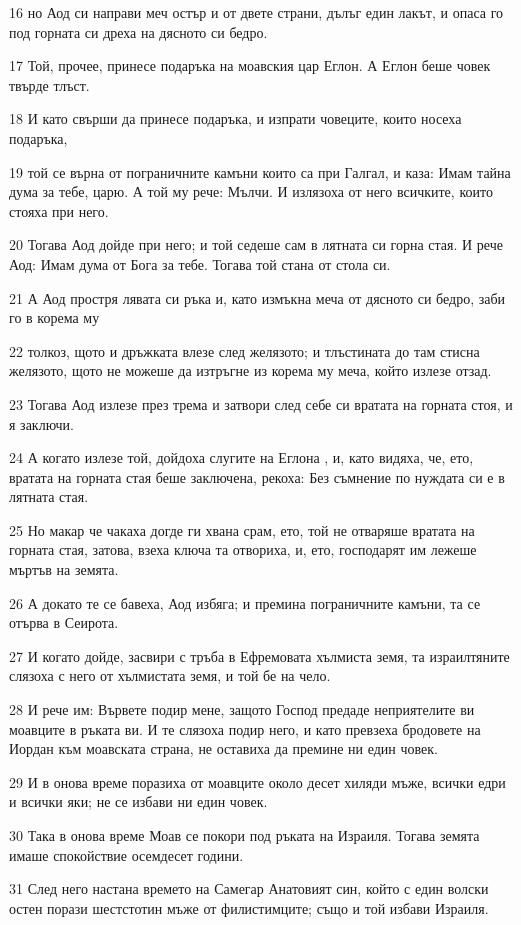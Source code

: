 \par 16 но Аод си направи меч остър и от двете страни, дълъг един лакът, и опаса го под горната си дреха на дясното си бедро.
\par 17 Той, прочее, принесе подаръка на моавския цар Еглон. А Еглон беше човек твърде тлъст.
\par 18 И като свърши да принесе подаръка, и изпрати човеците, които носеха подаръка,
\par 19 той се върна от пограничните камъни които са при Галгал, и каза: Имам тайна дума за тебе, царю. А той му рече: Мълчи. И излязоха от него всичките, които стояха при него.
\par 20 Тогава Аод дойде при него; и той седеше сам в лятната си горна стая. И рече Аод: Имам дума от Бога за тебе. Тогава той стана от стола си.
\par 21 А Аод простря лявата си ръка и, като измъкна меча от дясното си бедро, заби го в корема му
\par 22 толкоз, щото и дръжката влезе след желязото; и тлъстината до там стисна желязото, щото не можеше да изтръгне из корема му меча, който излезе отзад.
\par 23 Тогава Аод излезе през трема и затвори след себе си вратата на горната стоя, и я заключи.
\par 24 А когато излезе той, дойдоха слугите на Еглона , и, като видяха, че, ето, вратата на горната стая беше заключена, рекоха: Без съмнение по нуждата си е в лятната стая.
\par 25 Но макар че чакаха догде ги хвана срам, ето, той не отваряше вратата на горната стая, затова, взеха ключа та отвориха, и, ето, господарят им лежеше мъртъв на земята.
\par 26 А докато те се бавеха, Аод избяга; и премина пограничните камъни, та се отърва в Сеирота.
\par 27 И когато дойде, засвири с тръба в Ефремовата хълмиста земя, та израилтяните слязоха с него от хълмистата земя, и той бе на чело.
\par 28 И рече им: Вървете подир мене, защото Господ предаде неприятелите ви моавците в ръката ви. И те слязоха подир него, и като превзеха бродовете на Иордан към моавската страна, не оставиха да премине ни един човек.
\par 29 И в онова време поразиха от моавците около десет хиляди мъже, всички едри и всички яки; не се избави ни един човек.
\par 30 Така в онова време Моав се покори под ръката на Израиля. Тогава земята имаше спокойствие осемдесет години.
\par 31 След него настана времето на Самегар Анатовият син, който с един волски остен порази шестстотин мъже от филистимците; също и той избави Израиля.

